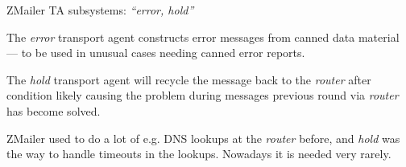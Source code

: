 \documentclass[a4paper,landscape]{slides}
\newcommand{\ZM}{ZMailer}
\begin{document}


\begin{slide}

\centerline{\large \ZM{} TA subsystems: {\it ``error, hold''}}

The {\it error} transport agent constructs error messages from
canned data material --- to be used in unusual cases needing
canned error reports.

The {\it hold} transport agent will recycle the message back to
the {\it router} after condition likely causing the problem
during messages previous round via {\it router} has become solved.

\ZM{} used to do a lot of e.g. DNS lookups at the {\it router} before,
and {\it hold} was the way to handle timeouts in the lookups.
Nowadays it is needed very rarely.

\vfill

\end{slide}

\end{document}

